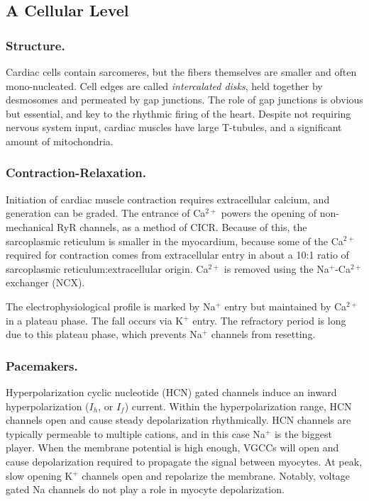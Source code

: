 \subsection{A Cellular Level}

\subsubsection{Structure.}
Cardiac cells contain sarcomeres, but the fibers themselves are smaller and often mono-nucleated. Cell edges are called \textit{intercalated disks}, held together by desmosomes and permeated by gap junctions. The role of gap junctions is obvious but essential, and key to the rhythmic firing of the heart. Despite not requiring nervous system input, cardiac muscles have large T-tubules, and a significant amount of mitochondria. 

\subsubsection{Contraction-Relaxation.} 

Initiation of cardiac muscle contraction requires extracellular calcium, and generation can be graded. The entrance of Ca$^{2+}$ powers the opening of non-mechanical RyR channels, as a method of CICR. Because of this, the sarcoplasmic reticulum is smaller in the myocardium, because some of the Ca$^{2+}$ required for contraction comes from extracellular entry in about a 10:1 ratio of sarcoplasmic reticulum:extracellular origin. Ca$^{2+}$ is removed using the Na$^+$-Ca$^{2+}$ exchanger (NCX).\newline

The electrophysiological profile is marked by Na$^+$ entry but maintained by Ca$^{2+}$ in a plateau phase. The fall occurs via K$^+$ entry. The refractory period is long due to this plateau phase, which prevents Na$^+$ channels from resetting. 

\subsubsection{Pacemakers.}
Hyperpolarization cyclic nucleotide (HCN) gated channels induce an inward hyperpolarization ($I_h$, or $I_f$) current. Within the hyperpolarization range, HCN channels open and cause steady depolarization rhythmically. HCN channels are typically permeable to multiple cations, and in this case Na$^+$ is the biggest player. When the membrane potential is high enough, VGCCs will open and cause depolarization required to propagate the signal between myocytes. At peak, slow opening K$^+$ channels open and repolarize the membrane. Notably, voltage gated Na channels do not play a role in myocyte depolarization. \newline

